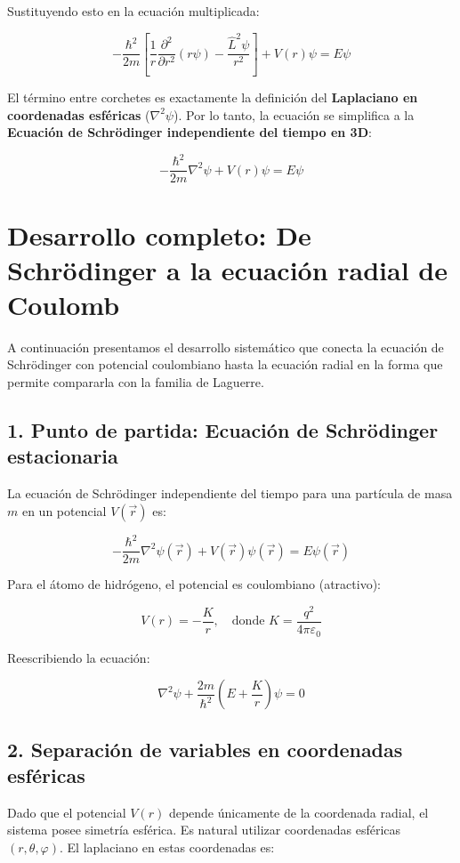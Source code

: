 \documentclass[a4paper]{article}
\begin{document}
Sustituyendo esto en la ecuación multiplicada:

\[
 -\frac{\hbar^2}{2m} \left[ \frac{1}{r} \frac{\partial^2}{\partial r^2}(r\psi) - \frac{\hat{L}^2 \psi}{r^2} \right] + V(r)\psi = E\psi 
\]

El término entre corchetes es exactamente la definición del \textbf{Laplaciano en coordenadas esféricas} ($\nabla^2 \psi$). Por lo tanto, la ecuación se simplifica a la \textbf{Ecuación de Schrödinger independiente del tiempo en 3D}:

\[
 -\frac{\hbar^2}{2m} \nabla^2 \psi + V(r)\psi = E\psi 
\]


\section{Desarrollo completo: De Schrödinger a la ecuación radial de Coulomb}

A continuación presentamos el desarrollo sistemático que conecta la ecuación de Schrödinger con potencial coulombiano hasta la ecuación radial en la forma que permite compararla con la familia de Laguerre.

\subsection{1. Punto de partida: Ecuación de Schrödinger estacionaria}

La ecuación de Schrödinger independiente del tiempo para una partícula de masa $m$ en un potencial $V(\vec{r})$ es:

\[
-\frac{\hbar^2}{2m}\nabla^2\psi(\vec{r}) + V(\vec{r})\psi(\vec{r}) = E\psi(\vec{r})
\]

Para el átomo de hidrógeno, el potencial es coulombiano (atractivo):

\[
V(r) = -\frac{K}{r}, \quad \text{donde } K = \frac{q^2}{4\pi\varepsilon_0}
\]

Reescribiendo la ecuación:

\[
\nabla^2\psi + \frac{2m}{\hbar^2}\left(E + \frac{K}{r}\right)\psi = 0
\]

\subsection{2. Separación de variables en coordenadas esféricas}

Dado que el potencial $V(r)$ depende únicamente de la coordenada radial, el sistema posee simetría esférica. Es natural utilizar coordenadas esféricas $(r, \theta, \varphi)$. El laplaciano en estas coordenadas es:
\end{document}
